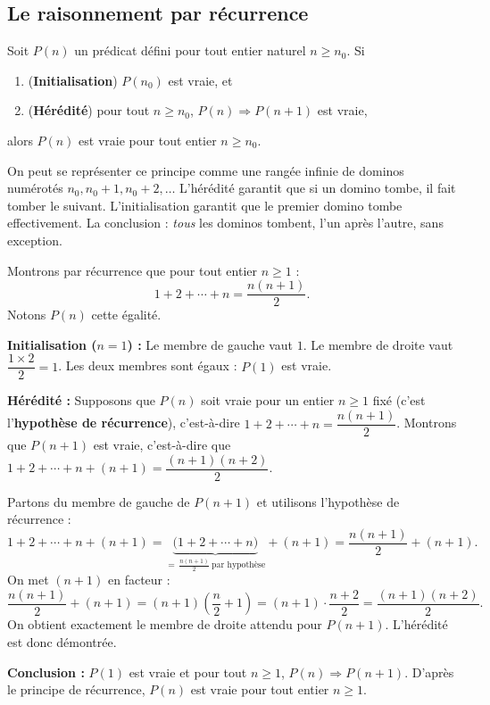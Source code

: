 \documentclass[a4paper,12pt,openany]{book}
\begin{document}
\subsection{Le raisonnement par récurrence}


\begin{proposition}
Soit $P(n)$ un prédicat défini pour tout entier naturel $n \geq n_0$. Si
\begin{enumerate}
  \item (\textbf{Initialisation}) $P(n_0)$ est vraie, et
  \item (\textbf{Hérédité}) pour tout $n\geq n_0$, $P(n)\Rightarrow P(n+1)$
  est vraie,
\end{enumerate}
alors $P(n)$ est vraie pour tout entier $n\geq n_0$.
\end{proposition}

\begin{remarque}
On peut se représenter ce principe comme une rangée infinie de dominos
numérotés $n_0, n_0+1, n_0+2,\dots$ L'hérédité garantit que si un domino tombe,
il fait tomber le suivant. L'initialisation garantit que le premier domino
tombe effectivement. La conclusion : \emph{tous} les dominos tombent, l'un
après l'autre, sans exception.
\end{remarque}

\begin{exemple}
Montrons par récurrence que pour tout entier $n\geq 1$ :
\[
1+2+\cdots+n = \frac{n(n+1)}{2}.
\]
Notons $P(n)$ cette égalité.

\textbf{Initialisation ($n=1$) :} Le membre de gauche vaut $1$. Le membre de
droite vaut $\dfrac{1\times 2}{2}=1$. Les deux membres sont égaux : $P(1)$ est
vraie.

\textbf{Hérédité :} Supposons que $P(n)$ soit vraie pour un entier $n\geq 1$
fixé (c'est l'\textbf{hypothèse de récurrence}), c'est-à-dire
$1+2+\cdots+n=\dfrac{n(n+1)}{2}$. Montrons que $P(n+1)$ est vraie, c'est-à-dire
que $1+2+\cdots+n+(n+1) = \dfrac{(n+1)(n+2)}{2}$.

Partons du membre de gauche de $P(n+1)$ et utilisons l'hypothèse de
récurrence :
\[
1+2+\cdots+n+(n+1) = \underbrace{\big(1+2+\cdots+n\big)}_{=\,\frac{n(n+1)}{2}\ \text{par hypothèse}} + (n+1)
= \frac{n(n+1)}{2}+(n+1).
\]
On met $(n+1)$ en facteur :
\[
\frac{n(n+1)}{2}+(n+1) = (n+1)\left(\frac{n}{2}+1\right) = (n+1)\cdot\frac{n+2}{2} = \frac{(n+1)(n+2)}{2}.
\]
On obtient exactement le membre de droite attendu pour $P(n+1)$. L'hérédité
est donc démontrée.

\textbf{Conclusion :} $P(1)$ est vraie et pour tout $n\geq1$, $P(n)\Rightarrow
P(n+1)$. D'après le principe de récurrence, $P(n)$ est vraie pour tout entier
$n\geq 1$.
\end{exemple}
\end{document}
